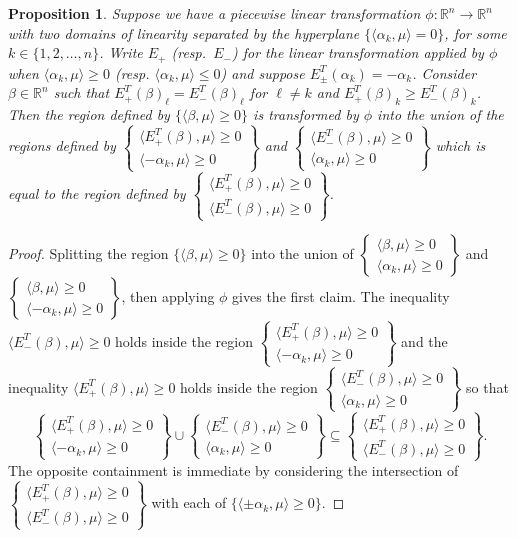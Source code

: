 \documentclass{amsart}
\newtheorem{proposition}[theorem]{Proposition}
\numberwithin{theorem}{section}
\newcommand{\RR}{\mathbb{R}}
\begin{document}
  \begin{proposition}
    Suppose we have a piecewise linear transformation $\phi:\RR^n\to\RR^n$ with two domains of linearity separated by the hyperplane $\{\langle\alpha_k,\mu\rangle = 0\}$, for some $k\in\{1,2,\ldots,n\}$.
    Write $E_+$ (resp.~$E_-$) for the linear transformation applied by $\phi$ when $\langle\alpha_k,\mu\rangle\ge0$ (resp. $\langle\alpha_k,\mu\rangle\le 0$) and suppose $E_\pm^T(\alpha_k)=-\alpha_k$.
    Consider $\beta\in\RR^n$ such that $E_+^T(\beta)_\ell=E_-^T(\beta)_\ell$ for $\ell\ne k$ and $E_+^T(\beta)_k\ge E_-^T(\beta)_k$.
    Then the region defined by $\{\langle\beta,\mu\rangle\ge0\}$ is transformed by $\phi$ into the union of the regions defined by $\left\{\substack{\langle E_+^T(\beta),\mu\rangle \ge 0\\ \langle -\alpha_k,\mu\rangle \ge 0}\right\}$ and $\left\{\substack{\langle E_-^T(\beta),\mu\rangle \ge 0\\ \langle \alpha_k,\mu\rangle \ge 0}\right\}$ which is equal to the region defined by $\left\{\substack{\langle E_+^T(\beta),\mu\rangle \ge 0\\ \langle E_-^T(\beta),\mu\rangle \ge 0}\right\}$.
  \end{proposition}
  \begin{proof}
    Splitting the region $\{\langle\beta,\mu\rangle\ge0\}$ into the union of $\left\{\substack{\langle \beta,\mu\rangle \ge 0\\ \langle \alpha_k,\mu\rangle \ge 0}\right\}$ and $\left\{\substack{\langle \beta,\mu\rangle \ge 0\\ \langle -\alpha_k,\mu\rangle \ge 0}\right\}$, then applying $\phi$ gives the first claim.
    The inequality $\langle E_-^T(\beta),\mu\rangle \ge 0$ holds inside the region $\left\{\substack{\langle E_+^T(\beta),\mu\rangle \ge 0\\ \langle -\alpha_k,\mu\rangle \ge 0}\right\}$ and the inequality $\langle E_+^T(\beta),\mu\rangle \ge 0$ holds inside the region $\left\{\substack{\langle E_-^T(\beta),\mu\rangle \ge 0\\ \langle \alpha_k,\mu\rangle \ge 0}\right\}$ so that 
    \[\left\{\substack{\langle E_+^T(\beta),\mu\rangle \ge 0\\ \langle -\alpha_k,\mu\rangle \ge 0}\right\} \cup \left\{\substack{\langle E_-^T(\beta),\mu\rangle \ge 0\\ \langle \alpha_k,\mu\rangle \ge 0}\right\} \subseteq \left\{\substack{\langle E_+^T(\beta),\mu\rangle \ge 0\\ \langle E_-^T(\beta),\mu\rangle \ge 0}\right\}.\]
    The opposite containment is immediate by considering the intersection of $\left\{\substack{\langle E_+^T(\beta),\mu\rangle \ge 0\\ \langle E_-^T(\beta),\mu\rangle \ge 0}\right\}$ with each of $\{\langle\pm\alpha_k,\mu\rangle\ge0\}$. 
  \end{proof}
\end{document}
